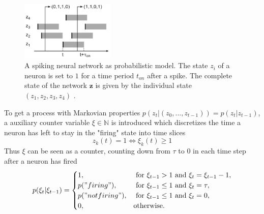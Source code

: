 \begin{figure}
	\centering
    	\includegraphics[width=0.4\textwidth]{imgs/snn_sample1.png} 
    \caption{A spiking neural network as probabilistic model. The state $z_i$ of a neuron is set to $1$ for a time period $t_{on}$ after a spike. The complete state of the network $\textbf{z}$ is given by the individual state $(z_1, z_2, z_3, z_4)$ .}
	\label{fig:snnsamp1}
\end{figure}

To get a process with Markovian properties $p(z_t| (z_0, ..., z_{t-1})) = p(z_t| z_{t-1}) $, a auxiliary counter variable $\xi \in \mathbb{N}$ is introduced which discretizes the time a neuron has left to stay in the "firing" state into time slices
\[
z_k(t) = 1 \iff \xi_k(t) \ge 1
\]
Thus $\xi$ can be seen as a counter, counting down from $\tau$ to $0$ in each time step after a neuron has fired
\[
p(\xi_t | \xi_{t-1}) = 
\begin{cases}
	1, & \text{ for } \xi_{t-1} > 1 \text{ and } \xi_t = \xi_{t-1} -1 ,\\
	p("firing"), & \text{ for } \xi_{t-1} \le 1 \text{ and } \xi_t = \tau ,\\
	p("not firing"), & \text{ for } \xi_{t-1} \le 1 \text{ and } \xi_t = 0 ,\\
	0, & \text{otherwise}.
\end{cases}
\]

